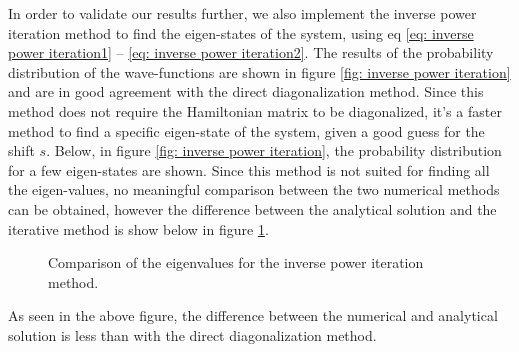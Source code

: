 \documentclass[a4paper]{article}
\begin{document}
In order to validate our results further, we also implement the inverse power iteration method to find the eigen-states of the system, using eq \eqref{eq: inverse power iteration1} -- \eqref{eq: inverse power iteration2}.
The results of the probability distribution of the wave-functions are shown in figure \ref{fig: inverse power iteration} and are in good agreement with the direct diagonalization method.
Since this method does not require the Hamiltonian matrix to be diagonalized, it's a faster method to find a specific eigen-state of the system, given a good guess for the shift $s$. Below, in figure \ref{fig: inverse power iteration}, the probability distribution for a few eigen-states are shown.
Since this method is not suited for finding all the eigen-values, no meaningful comparison between the two numerical methods can be obtained, however the difference between the analytical solution and the iterative method is show below in figure \ref{fig: inverse comparison}.
\begin{figure}[H]
    \centering
    \caption{Comparison of the eigenvalues for the inverse power iteration method.}
    \label{fig: inverse comparison}
\end{figure}\noindent
As seen in the above figure, the difference between the numerical and analytical solution is less than with the direct diagonalization method.
\end{document}
